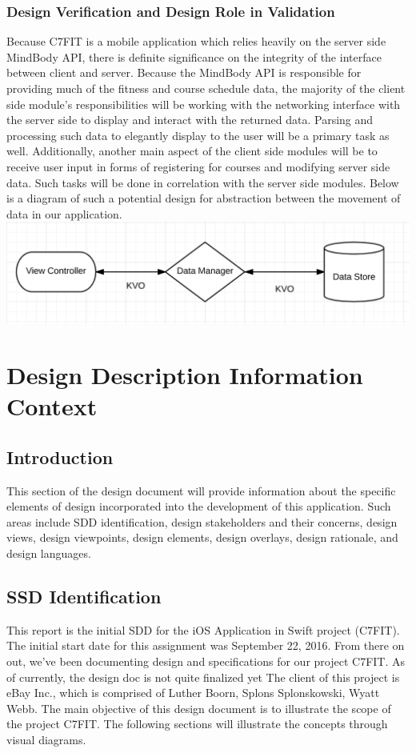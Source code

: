 \documentclass[letterpaper,10pt,titlepage]{article}
\begin{document}
\subsubsection{Design Verification and Design Role in Validation}
Because C7FIT is a mobile application which relies heavily on the server side MindBody API, there is definite significance on the integrity of the interface between client and server. Because the MindBody API is responsible for providing much of the fitness and course schedule data, the majority of the client side module's responsibilities will be working with the networking interface with the server side to display and interact with the returned data. Parsing and processing such data to elegantly display to the user will be a primary task as well. Additionally, another main aspect of the client side modules will be to receive user input in forms of registering for courses and modifying server side data. Such tasks will be done in correlation with the server side modules. Below is a diagram of such a potential design for abstraction between the movement of data in our application. \\

\includegraphics[width=\textwidth]{dataflow.png}

\section{Design Description Information Context}

\subsection{Introduction}
This section of the design document will provide information about the specific elements of design incorporated into the development of this application. Such areas include SDD identification, design stakeholders and their concerns, design views, design viewpoints, design elements, design overlays, design rationale, and design languages.

\subsection{SSD Identification}
This report is the initial SDD for the iOS Application in Swift project (C7FIT). The initial start date for this assignment was September 22, 2016. From there on out, we've been documenting design and specifications for our project C7FIT. As of currently, the design doc is not quite finalized yet The client of this project is eBay Inc., which is comprised of Luther Boorn, Splons Splonskowski, Wyatt Webb. The main objective of this design document is to illustrate the scope of the project C7FIT. The following sections will illustrate the concepts through visual diagrams.
\end{document}
